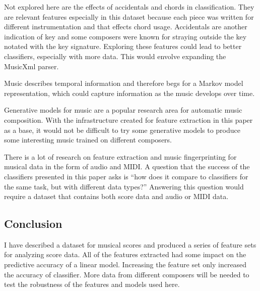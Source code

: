 \documentclass[10pt]{IEEEtran}
\begin{document}
Not explored here are the effects of accidentals and chords in classification.
They are relevant features especially in this dataset because each piece
was written for different instrumentation and that effects chord usage.
Accidentals are another indication of key and some composers were known for
straying outside the key notated with the key signature. Exploring these
features could lead to better classifiers, especially with more data. This
would envolve expanding the MusicXml parser.

Music describes temporal information and therefore begs for a Markov model
representation, which could capture information as the music develops over time.

Generative models for music are a popular research area for automatic music
composition. With the infrastructure created for feature extraction in this
paper as a base, it would not be difficult to try some generative models to
produce some interesting music trained on different composers.

There is a lot of research on feature extraction and music fingerprinting
for musical data in the form of audio and MIDI. A question that the
success of the classifiers presented in this paper asks is ``how does it
compare to classifiers for the same task, but with different data types?''
Answering this question would require a dataset that contains both score
data and audio or MIDI data.

\subsection{Conclusion}

I have described a dataset for musical scores and produced a series of feature
sets for analyzing score data. All of the features extracted had some impact on
the predictive accuracy of a linear model. Increasing the feature set only
increased the accuracy of classifier. More data from different composers
will be needed to test the robustness of the features and models used here.

\nocite{Mutopia}
\nocite{jshanley}


\end{document}
